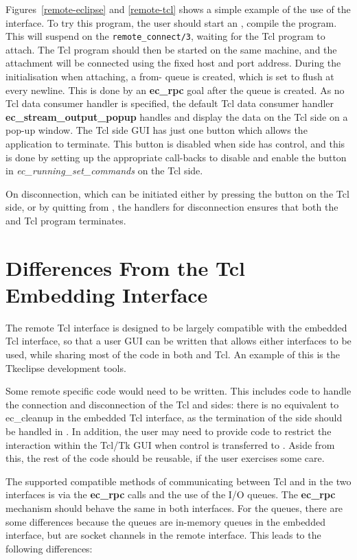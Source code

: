Figures~\ref{remote-eclipse} and \ref{remote-tcl} shows a simple example of
the use of the interface. To try this program, the user should start an
{\eclipse}, compile the {\eclipse} program. This will suspend on the
\verb'remote_connect/3', waiting for the Tcl program to attach. The Tcl
program should then be started on the same machine, and the attachment will
be connected using the fixed host and port address. During the
initialisation when attaching, 
a from-{\eclipse} queue is created, which is set
to flush at every newline. This is done by an {\bf ec_rpc} goal after the
queue is created. As no Tcl data consumer handler is specified, the default
Tcl data consumer handler {\bf ec_stream_output_popup} handles and display the data on the Tcl side on a
pop-up window. The Tcl side
GUI has just one button which allows the application to terminate. This
button is disabled when {\eclipse} side has control, and this is done by
setting up the appropriate call-backs to disable and enable the button in
{\it ec_running_set_commands\/} on the Tcl side.

On disconnection, which can be initiated either by pressing the button on
the Tcl side, or by quitting from {\eclipse}, the handlers for
disconnection ensures that both the {\eclipse} and Tcl program terminates. 

\section{Differences From the Tcl Embedding Interface}
\label{remotediff}

The remote Tcl interface is designed to be largely compatible with the
embedded Tcl interface, so that a user GUI can be written that allows
either interfaces to be used, while sharing most of the code in both
{\eclipse} and Tcl. An example of this is the Tkeclipse development tools.

Some remote specific code would need to be written. This includes code to
handle the connection and disconnection of the Tcl and {\eclipse}
sides: there is no equivalent to ec_cleanup in the embedded Tcl interface,
as the termination of the {\eclipse} side should be handled in {\eclipse}. In
addition, the user may need to provide code to restrict the interaction
within the Tcl/Tk GUI when control is transferred to {\eclipse}. Aside from
this, the rest of the code should be reusable, if the user exercises some
care.

The supported compatible methods of communicating between Tcl and
{\eclipse} in the two interfaces is via the {\bf ec_rpc} calls and the use
of the I/O queues. The {\bf ec_rpc} mechanism should behave the same in
both interfaces. For the queues, there are some differences because the
queues are in-memory queues in the embedded interface, but are socket
channels in the remote interface. This leads to the following differences:

